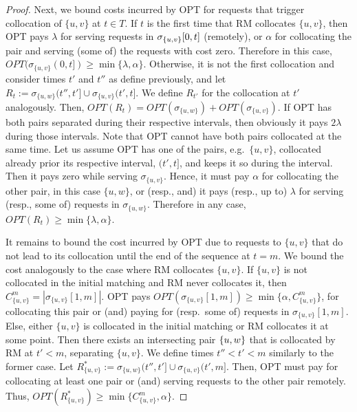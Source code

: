 \documentclass[a4paper,anonymous,USenglish]{lipics-v2019}
\newcommand{\OPT}{\textsc{OPT}\xspace}
\newcommand{\OPTM}{\mathit{OPT}}
\newcommand{\RM}{\textsc{RM}\xspace} %
\DeclarePairedDelimiter\set{\{}{\}}
\begin{document}
\begin{proof}
	Next,
	we bound  costs incurred by \OPT for requests that trigger collocation of $\{u,v\}$ at $t \in T$.
	If $t$ is the first time that \RM collocates $\{u,v\}$,
	 then  \OPT pays
	$\lambda$ for serving requests in $\sigma_{\set{u,v}}[0,t]$ (remotely),
	or $\alpha$ for collocating the pair and
	serving (some of) the requests with  cost zero.
	Therefore in this case,
	$\OPTM (\sigma_{\{u,v\}}(0,t]) \geq  \min{\{ \lambda,\alpha \}}$.
	Otherwise,
	it is not the first collocation and
	consider times $t'$ and $t''$ as define previously,
	 and let 
	$R_t := \sigma_{\{u,w\}}(t'',t'] \cup \sigma_{\{u,v\}}(t',t] $.
	We define $R_{t'}$ for the collocation at $t'$  analogously.
	Then,
	$\OPTM(R_t) = \mathit{OPT} (\sigma_{\{u,w\}}) 
	+ \OPTM(\sigma_{\{u,v\}}) $.
	If \OPT has both pairs separated during their respective intervals,
	then obviously it pays $2\lambda$ during those intervals.
	Note that \OPT cannot have both pairs collocated at the same time.
	Let us assume \OPT has one of the pairs,
	e.g.~$\{u,v\}$,
	 collocated already prior its respective interval, $(t',t]$,
	 and keeps it so during the interval.
	 Then it pays zero while serving $\sigma_{\{u,v\}}$.
	Hence,
	it must pay $\alpha$ for collocating the other pair, in this case $\{u,w\}$,
	or (resp., and) it pays (resp., up to) $\lambda$ for serving (resp., some of) requests in $\sigma_{\{u,w\}}$. 
	Therefore in any case,
	$\OPTM(R_t) \geq  \min{\{ \lambda,\alpha \}}$.
	
	It remains to bound the cost  incurred by \OPT due to requests to $\{u,v\}$ that do not lead to its collocation until the end of the sequence at $t=m$.
	We bound the cost analogously to the case where \RM collocates $\{u,v\}$.
	If $\{u,v\}$ is not collocated in the initial matching
	and \RM never collocates it,
	then $ C^{m}_{ \{u,v\} } =| \sigma_{\{u,v\}}[1,m] |$.
	\OPT pays
	$\mathit{OPT} (\sigma_{\{u,v\}}[1,m]) 
	\geq \min{ \{ \alpha, C^{m}_{ \{u,v\} } \} }$,
	for collocating this pair or (and) paying for (resp.~some of) requests in $\sigma_{\{u,v\}}[1,m]$.
	Else,
	either $\{u,v\}$ is collocated in the initial matching
	or \RM collocates it at some point.
	Then there exists an intersecting pair $\set{u,w}$
	that is collocated by \RM at $t' < m$,
	separating $\{u,v\}$.
	We define times $t'' < t' < m$ similarly to the former case.
	Let $R^*_{\{u,v\}} := \sigma_{\{u,w\}} (t'',t'] \cup \sigma_{\{u,v\}} (t',m]$.
	Then,
	\OPT must pay for collocating at least one pair or (and) serving requests 
	to the other pair remotely.
	Thus,
	$\mathit{OPT} (R^*_{\{u,v\}}) 
	\geq  \min{ \{ C^{m}_{ \{u,v\}}, \alpha \}}$.
	

\end{proof}
\end{document}

